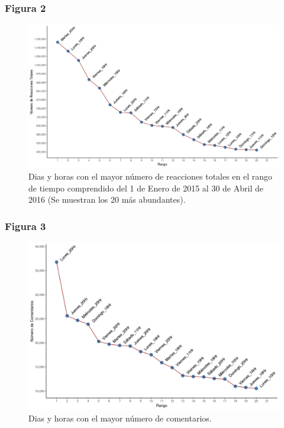 \documentclass[a4paper,10pt]{article}
\begin{document}
\subsubsection{Figura 2}
\begin{figure}[H]
  \begin{center}
   \includegraphics[width=.85\textwidth]{imagenes/figura2.png}
   \captionsetup{width=.80\textwidth}
   \caption{\centering Dias y horas con el mayor número de reacciones totales en el rango de tiempo
   comprendido del 1 de Enero de 2015 al 30 de Abril de 2016 (Se muestran los  20 más abundantes).}
  \end{center} 
\end{figure}

\subsubsection{Figura 3}
\begin{figure}[H]
  \begin{center}
   \includegraphics[width=.85\textwidth]{imagenes/figura3.png}
   \captionsetup{width=.80\textwidth}
   \caption{\centering Dias y horas con el mayor número de comentarios.} 
   \end{center} 
\end{figure}
\end{document}
